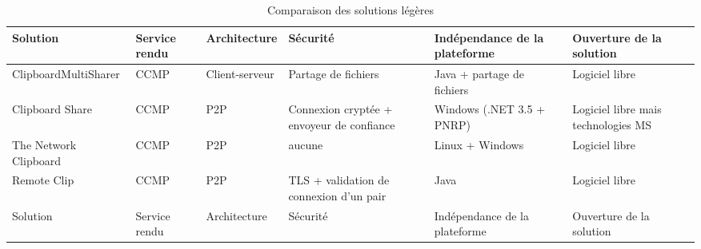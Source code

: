\begin{sidewaystable}[!h]
  \centering
  \begin{tabular}{|l|l|l|m{7em}|m{7em}|m{7em}|}
    \hline
    Solution & Service rendu & Architecture & Sécurité & In\-dé\-pen\-dance
    de la plateforme & Ouverture de la solution \\
    \hline
    \hline
    Clipboard\-MultiSharer & CCMP & Client-serveur & Partage de fichiers & Java
    + partage de fichiers & Logiciel libre\\
    \hline
    Clipboard Share & CCMP & P2P & Connexion cryptée + envoyeur de confiance &
    Windows (.NET 3.5 + PNRP) & Logiciel libre mais technologies MS \\
    \hline
    The Network Clipboard & CCMP & P2P & aucune & Linux + Windows &
    Logiciel libre \\
    \hline
    Remote Clip & CCMP & P2P & TLS + validation de connexion d'un pair &
    Java & Logiciel libre \\
    \hline
    \hline
    Solution & Service rendu & Architecture & Sécurité & In\-dé\-pen\-dance
    de la plateforme & Ouverture de la solution \\
    \hline
  \end{tabular}
  \caption{\label{tbl:comp_leger} Comparaison des solutions légères}
\end{sidewaystable}

